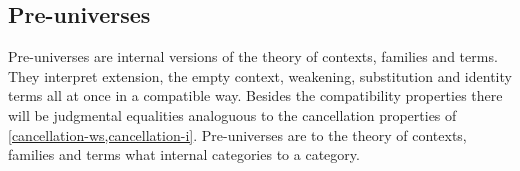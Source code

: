 \subsection{Pre-universes}
Pre-universes are internal versions of the theory of contexts, families and
terms. They interpret extension, the empty context, weakening, substitution
and identity terms all at once in a compatible way. Besides the compatibility
properties there will be judgmental equalities analoguous to the cancellation
properties of \autoref{cancellation-ws,cancellation-i}. Pre-universes are to
the theory of contexts, families and terms what internal categories to a
category.
